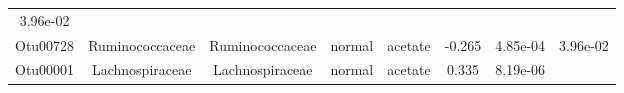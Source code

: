 \documentclass[11pt,]{article}
\begin{document}
\begin{longtable}[]{@{}cccccccc@{}}
\begin{minipage}[t]{0.08\columnwidth}
3.96e-02\strut
\end{minipage}\tabularnewline
\begin{minipage}[t]{0.08\columnwidth}\centering\strut
Otu00728\strut
\end{minipage} & \begin{minipage}[t]{0.15\columnwidth}\centering\strut
Ruminococcaceae\strut
\end{minipage} & \begin{minipage}[t]{0.15\columnwidth}\centering\strut
Ruminococcaceae\strut
\end{minipage} & \begin{minipage}[t]{0.08\columnwidth}\centering\strut
normal\strut
\end{minipage} & \begin{minipage}[t]{0.09\columnwidth}\centering\strut
acetate\strut
\end{minipage} & \begin{minipage}[t]{0.07\columnwidth}\centering\strut
-0.265\strut
\end{minipage} & \begin{minipage}[t]{0.08\columnwidth}\centering\strut
4.85e-04\strut
\end{minipage} & \begin{minipage}[t]{0.08\columnwidth}\centering\strut
3.96e-02\strut
\end{minipage}\tabularnewline
\begin{minipage}[t]{0.08\columnwidth}\centering\strut
Otu00001\strut
\end{minipage} & \begin{minipage}[t]{0.15\columnwidth}\centering\strut
Lachnospiraceae\strut
\end{minipage} & \begin{minipage}[t]{0.15\columnwidth}\centering\strut
Lachnospiraceae\strut
\end{minipage} & \begin{minipage}[t]{0.08\columnwidth}\centering\strut
normal\strut
\end{minipage} & \begin{minipage}[t]{0.09\columnwidth}\centering\strut
acetate\strut
\end{minipage} & \begin{minipage}[t]{0.07\columnwidth}\centering\strut
0.335\strut
\end{minipage} & \begin{minipage}[t]{0.08\columnwidth}\centering\strut
8.19e-06\strut
\end{minipage} & \begin{minipage}[t]{0.08\columnwidth}\centering\strut

\end{minipage}
\end{longtable}
\end{document}
